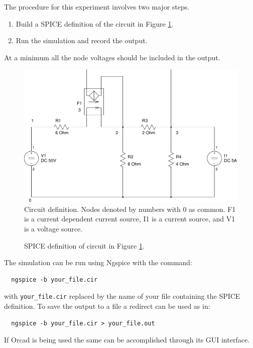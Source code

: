 \documentclass{article}
\begin{document}
The procedure for this experiment involves two major steps.
\begin{enumerate}
\item Build a SPICE definition of the circuit in Figure \ref{fig:circuit}.
\item Run the simulation and record the output.
\end{enumerate}
At a minimum all the node voltages should be included in the output.

\begin{figure}[!hbtp]
\center
\includegraphics[scale=0.5]{spice/circuit}
\caption{Circuit definition.
Nodes denoted by numbers with 0 as common.
F1 is a current dependent current source, I1 is a current source, and V1 is a voltage source.}
\label{fig:circuit}
\end{figure}

\begin{figure}[!hbtp]

\caption{SPICE definition of circuit in Figure \ref{fig:circuit}.}
\end{figure}

The simulation can be run using Ngspice with the command:
\begin{verbatim}
  ngspice -b your_file.cir
\end{verbatim}
with \verb+your_file.cir+ replaced by the name of your file
containing the SPICE definition.
To save the output to a file a redirect can be used as
in:
\begin{verbatim}
  ngspice -b your_file.cir > your_file.out
\end{verbatim}
If Orcad is being used the same can be accomplished through
its GUI interface.

\clearpage
\end{document}

